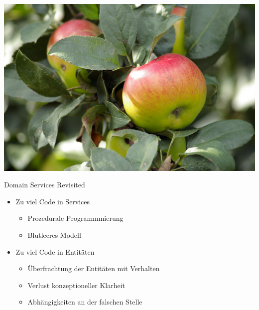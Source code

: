 \begin{frame}{}
\includegraphics[width=\framewidth]{pics/autumn.jpg}
\end{frame}



\begin{frame}{Domain Services Revisited}
\begin{itemize}
\item Zu viel Code in Services
\begin{itemize}
\item Prozedurale Programmmierung
\item Blutleeres Modell
\end{itemize}
\item Zu viel Code in Entitäten
\begin{itemize}
\item Überfrachtung der Entitäten mit Verhalten
\item Verlust konzeptioneller Klarheit
\item Abhängigkeiten an der falschen Stelle
\end{itemize}
\end{itemize}
\end{frame}


